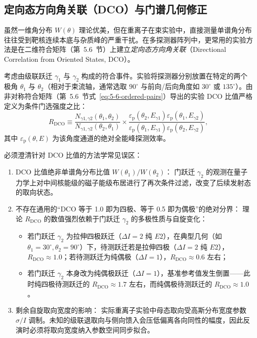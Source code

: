 \subsection{定向态方向角关联（DCO）与门谱几何修正}\label{subsec:5-7-3}

虽然一维角分布 $W(\theta)$ 理论优美，但在重离子在束实验中，直接测量单谱角分布往往受到靶核连续本底与杂质峰的严重干扰。在多探测器阵列中，更常用的实验方法是在二维符合矩阵（第~5.6~节）上建立\emph{定向态方向角关联}（Directional Correlation from Oriented States, DCO）。

考虑由级联跃迁 $\gamma_1$ 与 $\gamma_2$ 构成的符合事件。实验将探测器分别放置在特定的两个极角 $\theta_1$ 与 $\theta_2$（相对于束流轴，通常选取 $90^\circ$ 与前向/后向角度如 $30^\circ$ 或 $135^\circ$）。由非对称符合矩阵（第~5.6~节式~\eqref{eq:5-6-ordered-pairs}）导出的实验 DCO 比值严格定义为条件门选强度之比：
\begin{equation}\label{eq:5-7-dco-def}
R_{\mathrm{DCO}} \equiv \frac{N_{\gamma 1, \gamma 2}(\theta_1, \theta_2)}{N_{\gamma 1, \gamma 2}(\theta_2, \theta_1)} \times \frac{\varepsilon_{\mathrm{p}}(\theta_2, E_{\gamma 1}) \varepsilon_{\mathrm{p}}(\theta_1, E_{\gamma 2})}{\varepsilon_{\mathrm{p}}(\theta_1, E_{\gamma 1}) \varepsilon_{\mathrm{p}}(\theta_2, E_{\gamma 2})},
\end{equation}
其中 $\varepsilon_{\mathrm{p}}(\theta, E)$ 为该角度通道的绝对全能峰探测效率。

必须澄清针对 DCO 比值的方法学常见误区：
\begin{enumerate}
\item DCO 比值绝非单谱角分布比值 $W(\theta_1)/W(\theta_2)$：
门跃迁 $\gamma_2$ 的观测在量子力学上对中间核能级的磁子能级布居进行了再次条件过滤，改变了后续发射态的取向状态。
\item 不存在通用的“DCO 等于 1.0 即为四极、等于 0.5 即为偶极”的绝对分界：
理论 $R_{\mathrm{DCO}}$ 的数值强烈依赖于门跃迁 $\gamma_2$ 的多极性质与自旋变化：
\begin{itemize}
\item 若门跃迁 $\gamma_2$ 为拉伸四极跃迁（$\Delta I = 2$ 纯 $E2$），在典型几何（如 $\theta_1 = 30^\circ, \theta_2 = 90^\circ$）下，待测跃迁若是拉伸四极（$\Delta I = 2$ 纯 $E2$），$R_{\mathrm{DCO}} \approx 1.0$；若待测跃迁为纯偶极（$\Delta I = 1$），$R_{\mathrm{DCO}} \approx 0.6$ 左右；
\item 若门跃迁 $\gamma_2$ 本身改为纯偶极跃迁（$\Delta I = 1$），基准参考值发生倒置——此时纯四极待测跃迁的 $R_{\mathrm{DCO}} \approx 1.7$ 左右，而纯偶极待测跃迁的 $R_{\mathrm{DCO}} \approx 1.0$。
\end{itemize}
\item 剩余自旋取向宽度的影响：
实际重离子实验中母态取向受高斯分布宽度参数 $\sigma/I$ 调制。未知的级联退取向与侧向馈入会压低偏离各向同性的幅度，因此反演时必须将取向宽度纳入参数空间同步拟合。
\end{enumerate}

